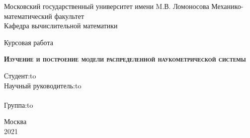 \begin{titlepage}

\begin{center}
Московский государственный университет имени M.В. Ломоносова
Механико-математический факультет \\
Кафедра вычислительной математики \\
\end{center}

\vspace{8em}

\begin{center}
\Large Курсовая работа \\ 
\end{center}

\vspace{2em}

\begin{center}
\textsc{\textbf{Изучение и построение модели распределенной наукометрической системы}}
\end{center}

\vspace{24em}



\newbox{\lbox}
\newlength{\maxl}
\setlength{\maxl}{\wd\lbox}
\hfill\parbox{13cm}{
\hspace*{5cm}\hspace*{-5cm}Студент:\hfill\hbox to\\
\hspace*{5cm}\hspace*{-5cm}Научный руководитель:\hfill\hbox to\\
\\
\hspace*{5cm}\hspace*{-5cm}Группа:\hfill\hbox to\\
}


\vspace{\fill}

\begin{center}
Москва \\2021
\end{center}

\end{titlepage}
\newpage
